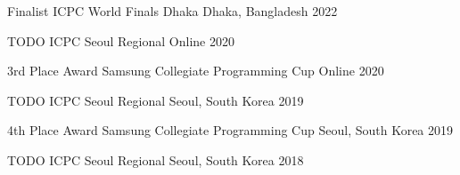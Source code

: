 



\begin{cvhonors}

  \cvhonor
    {Finalist} %
    {ICPC World Finals Dhaka} %
    {Dhaka, Bangladesh} %
    {2022} %

\end{cvhonors}




\begin{cvhonors}

  \cvhonor
    {TODO} %
    {ICPC Seoul Regional} %
    {Online} %
    {2020} %

  \cvhonor
    {3rd Place Award} %
    {Samsung Collegiate Programming Cup} %
    {Online} %
    {2020} %

  \cvhonor
    {TODO} %
    {ICPC Seoul Regional} %
    {Seoul, South Korea} %
    {2019} %
    
  \cvhonor
    {4th Place Award} %
    {Samsung Collegiate Programming Cup} %
    {Seoul, South Korea} %
    {2019} %

  \cvhonor
    {TODO} %
    {ICPC Seoul Regional} %
    {Seoul, South Korea} %
    {2018} %

\end{cvhonors}

